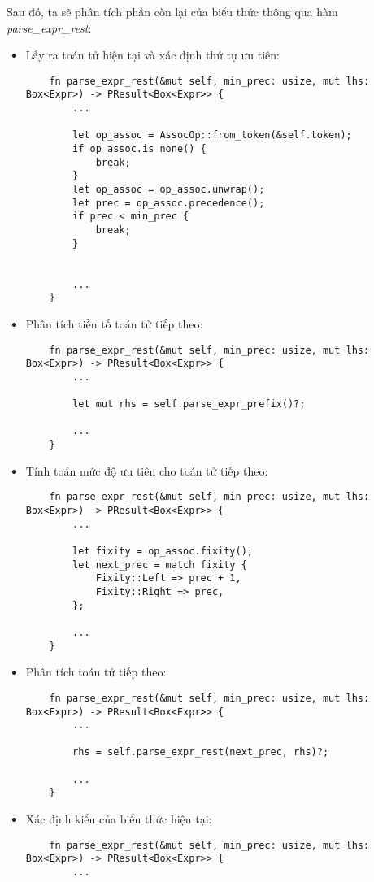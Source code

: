 Sau đó, ta sẽ phân tích phần còn lại của biểu thức thông qua hàm \textit{parse\_expr\_rest}:
\begin{itemize}
    \item Lấy ra toán tử hiện tại và xác định thứ tự ưu tiên:
\begin{lstlisting}
    fn parse_expr_rest(&mut self, min_prec: usize, mut lhs: Box<Expr>) -> PResult<Box<Expr>> {
        ...
        
        let op_assoc = AssocOp::from_token(&self.token);
        if op_assoc.is_none() {
            break;
        }
        let op_assoc = op_assoc.unwrap();
        let prec = op_assoc.precedence();
        if prec < min_prec {
            break;
        }

        
        ...
    }
\end{lstlisting}
    \item Phân tích tiền tố toán tử tiếp theo:
\begin{lstlisting}
    fn parse_expr_rest(&mut self, min_prec: usize, mut lhs: Box<Expr>) -> PResult<Box<Expr>> {
        ...

        let mut rhs = self.parse_expr_prefix()?;
        
        ...
    }
\end{lstlisting}
    \item Tính toán mức độ ưu tiên cho toán tử tiếp theo:
\begin{lstlisting}
    fn parse_expr_rest(&mut self, min_prec: usize, mut lhs: Box<Expr>) -> PResult<Box<Expr>> {
        ...

        let fixity = op_assoc.fixity();
        let next_prec = match fixity {
            Fixity::Left => prec + 1,
            Fixity::Right => prec,
        };
        
        ...
    }
\end{lstlisting}
    \item Phân tích toán tử tiếp theo:
\begin{lstlisting}
    fn parse_expr_rest(&mut self, min_prec: usize, mut lhs: Box<Expr>) -> PResult<Box<Expr>> {
        ...

        rhs = self.parse_expr_rest(next_prec, rhs)?;
        
        ...
    }
\end{lstlisting}
    \item Xác định kiểu của biểu thức hiện tại:
\begin{lstlisting}
    fn parse_expr_rest(&mut self, min_prec: usize, mut lhs: Box<Expr>) -> PResult<Box<Expr>> {
        ...
        

\end{lstlisting}
\end{itemize}
